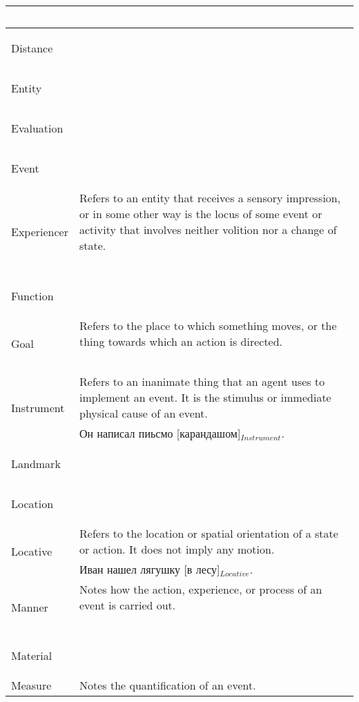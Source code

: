 \documentclass[a4paper,11pt, onecolumn,twoside]{article}
\begin{document}
\begin{longtable}{ p{}  p{} }
        & ~ \\
\midrule
 \multirow{2}{*}{Distance} & ~ \\ 
        & ~ \\
\midrule
 \multirow{2}{*}{Entity} & ~ \\ 
        & ~ \\
\midrule
 \multirow{2}{*}{Evaluation} & ~ \\ 
        & ~ \\
\midrule
 \multirow{2}{*}{Event} & ~ \\ 
        & ~ \\
\midrule
 \multirow{2}{*}{Experiencer} & Refers to an entity that receives a sensory impression, or in some other way is the locus of some event or activity that involves neither volition nor a change of state. \\ 
        & ~ \\
\midrule
 \multirow{2}{*}{Function} & ~ \\ 
        & ~ \\
\midrule
 \multirow{2}{*}{Goal} & Refers to the place to which something moves, or the thing towards which an action is directed. \\ 
        & ~ \\
\midrule
 \multirow{2}{*}{Instrument} & Refers to an inanimate thing that an agent uses to implement an event. It is the stimulus or immediate physical cause of an event. \\ 
        & Он написал пиьсмо [карандашом]$_{Instrument}$. \\
\midrule
 \multirow{2}{*}{Landmark} & ~ \\ 
        & ~ \\
\midrule
 \multirow{2}{*}{Location} & ~ \\ 
        & ~ \\
\midrule
 \multirow{2}{*}{Locative} & Refers to the location or spatial orientation of a state or action. It does not imply any motion. \\ 
        & Иван нашел лягушку [в лесу]$_{Locative}$. \\
\midrule
 \multirow{2}{*}{Manner} & Notes how the action, experience, or process of an event is carried out. \\ 
        & ~ \\
\midrule
 \multirow{2}{*}{Material} & ~ \\ 
        & ~ \\
\midrule
 \multirow{2}{*}{Measure} & Notes the quantification of an event. \\ 

\end{longtable}
\end{document}
